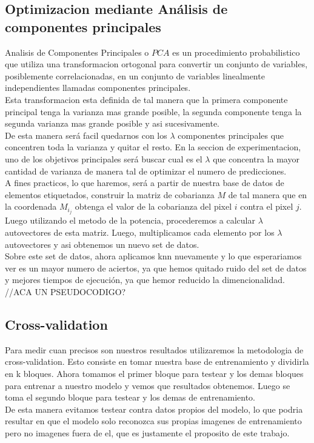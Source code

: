 \subsection{Optimizacion mediante An\'alisis de componentes principales}
Analisis de Componentes Principales o $PCA$ es un procedimiento probabilistico que utiliza una transformacion ortogonal para convertir un conjunto de variables, posiblemente correlacionadas, en un conjunto de variables linealmente independientes llamadas componentes principales.
\\
Esta transformacion esta definida de tal manera que la primera componente principal tenga la varianza mas grande posible, la segunda componente tenga la segunda varianza mas grande posible y asi sucesivamente.
\\
De esta manera será facil quedarnos con los $\lambda$ componentes principales que concentren toda la varianza y quitar el resto. En la seccion de experimentacion, uno de los objetivos principales será buscar cual es el $\lambda$ que concentra la mayor cantidad de varianza de manera tal de optimizar el numero de predicciones. 
\\
A fines practicos, lo que haremos, será a partir de nuestra base de datos de elementos etiquetados, construir la matriz  de cobarianza $M$ de tal manera que en la coordenada $M_i_j$ obtenga el valor de la cobarianza del pixel $i$ contra el pixel $j$.
\\
Luego utilizando el metodo de la potencia, procederemos a calcular $\lambda$ autovectores de esta matriz. Luego, multiplicamos cada elemento por los $\lambda$ autovectores y asi obtenemos un nuevo set de datos.
\\
Sobre este set de datos, ahora aplicamos knn nuevamente y lo que esperariamos ver es un mayor numero de aciertos, ya que hemos quitado ruido del set de datos y mejores tiempos de ejecución, ya que hemor reducido la dimencionalidad.
\\
//ACA UN PSEUDOCODIGO?

\subsection{Cross-validation}
Para medir cuan precisos son nuestros resultados utilizaremos la metodologia de cross-validation. Esto consiste en tomar nuestra base de entrenamiento y dividirla en k bloques. Ahora tomamos el primer bloque para testear y los demas bloques para entrenar a nuestro modelo y vemos que resultados obtenemos. Luego se toma el segundo bloque para testear y los demas de entrenamiento.
\\
De esta manera evitamos testear contra datos propios del modelo, lo que podria resultar en que el modelo solo reconozca sus propias imagenes de entrenamiento pero no imagenes fuera de el, que es justamente el proposito de este trabajo.